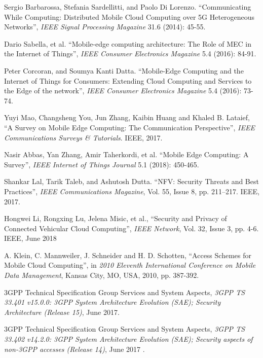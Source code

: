 \documentclass{ieeeaccess}
\begin{document}
	\begin{thebibliography}{1}
		Sergio Barbarossa, Stefania Sardellitti, and Paolo Di Lorenzo. ``Communicating While Computing: Distributed Mobile Cloud Computing over 5G Heterogeneous Networks'', \emph{IEEE Signal Processing Magazine} 31.6 (2014): 45-55. 
		
		Dario Sabella, et al. ``Mobile-edge computing architecture: The Role of MEC in the Internet of Things'', \emph{IEEE Consumer Electronics Magazine} 5.4 (2016): 84-91.
		
		Peter Corcoran, and Soumya Kanti Datta. ``Mobile-Edge Computing and the Internet of Things for Consumers: Extending Cloud Computing and Services to the Edge of the network'', \emph{IEEE Consumer Electronics Magazine} 5.4 (2016): 73-74.	
		
		Yuyi Mao, Changsheng You, Jun Zhang, Kaibin Huang and Khaled B. Lataief, ``A Survey on Mobile Edge Computing: The Communication Perspective'', \emph{IEEE Communications Surveys \& Tutorials}. IEEE, 2017.
		
		Nasir Abbas, Yan Zhang, Amir Taherkordi, et al. ``Mobile Edge Computing: A Survey'', \emph{IEEE Internet of Things Journal} 5.1 (2018): 450-465.
		
		Shankar Lal, Tarik Taleb, and Ashutosh Dutta. ``NFV: Security Threats and Best Practices'', \emph{IEEE Communications Magazine}, Vol. 55, Issue 8, pp. 211--217. IEEE, 2017.
		
		Hongwei Li, Rongxing Lu, Jelena Misic, et al., ``Security and Privacy of Connected Vehicular Cloud Computing'', \emph{IEEE Network}, Vol. 32, Issue 3, pp. 4-6. IEEE, June 2018
		
		A. Klein, C. Mannweiler, J. Schneider and H. D. Schotten, ``Access Schemes for Mobile Cloud Computing'', in \emph{2010 Eleventh International Conference on Mobile Data Management}, Kansas City, MO, USA, 2010, pp. 387-392.
		
		3GPP Technical Specification Group Services and System Aspects, \emph{3GPP TS 33.401 v15.0.0: 3GPP System Architecture Evolution (SAE); Security Architecture (Release 15)}, June 2017.
		
		3GPP Technical Specification Group Services and System Aspects, \emph{3GPP TS 33.402 v14.2.0:  3GPP System Architecture Evolution (SAE); Security aspects of non-3GPP accesses (Release 14)}, June 2017 .
		

\end{thebibliography}
\end{document}
